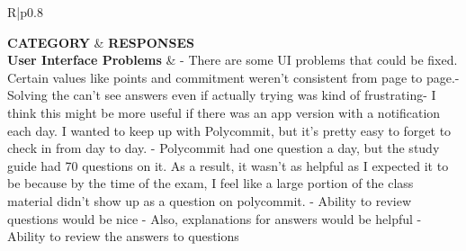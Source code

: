 
\renewcommand*{\arraystretch}{2.0}
{\fontsize{12pt}{8pt}\selectfont
{}
\begin{longtable}{R|p{0.8\linewidth}}
	
	\label{feedback-table}
	\textbf{CATEGORY} & \textbf{RESPONSES} \\
	\hline
		\textbf{User Interface Problems} &  - There are some UI problems that could be fixed. Certain values like points and commitment weren't consistent from page to page.\newline-   Solving the can't see answers even if actually trying was kind of frustrating\newline-   I think this might be more useful if there was an app version with a notification each day. I wanted to keep up with Polycommit, but it's pretty easy to forget to check in from day to day. \newline-   Polycommit had one question a day, but the study guide had 70 questions on it. As a result, it wasn't as helpful as I expected it to be because by the time of the exam, I feel like a large portion of the class material didn't show up as a question on polycommit. \newline - Ability to review questions would be nice \newline- Also, explanations for answers would be helpful                                                                                                                                                                                                                                                                                                                                                                                                                                                                                                                                                                                                          
		\newline - Ability to review the answers to questions                                                                                                                                                                                                                                                                                                                                                                                                                                                                                                                                                                                                                                                                                                       \\

\end{longtable}}
